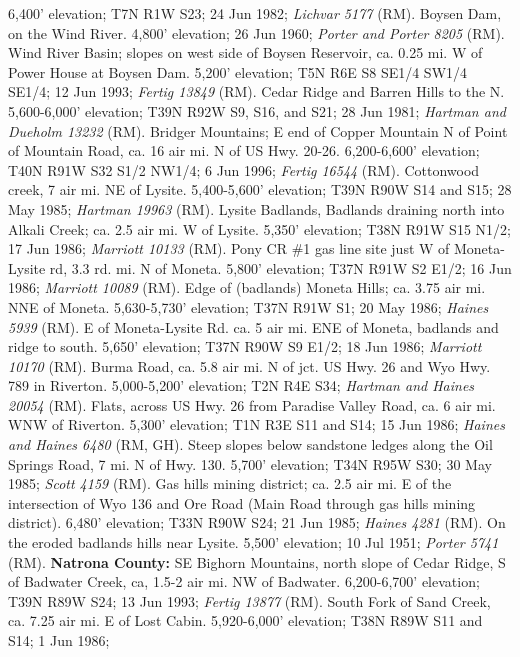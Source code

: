 6,400' elevation; T7N R1W S23; 24 Jun 1982; \textit{Lichvar 5177} (RM).
Boysen Dam, on the Wind River. 4,800' elevation; 26 Jun 1960;
\textit{Porter and Porter 8205} (RM).
Wind River Basin; slopes on west side of Boysen Reservoir, ca. 0.25 mi. W of
Power House at Boysen Dam. 5,200' elevation; T5N R6E S8	SE1/4 SW1/4 SE1/4;
12 Jun 1993; \textit{Fertig 13849} (RM).
Cedar Ridge and Barren Hills to the N. 5,600-6,000' elevation; T39N R92W S9,
S16, and S21; 28 Jun 1981; \textit{Hartman and Dueholm 13232} (RM).
Bridger Mountains; E end of Copper Mountain N of Point of Mountain Road, ca. 16
air mi. N of US Hwy. 20-26. 6,200-6,600' elevation; T40N R91W S32	S1/2 NW1/4;
6 Jun 1996; \textit{Fertig 16544} (RM).
Cottonwood creek, 7 air mi. NE of Lysite. 5,400-5,600' elevation; T39N R90W S14
and S15; 28 May 1985; \textit{Hartman 19963} (RM).
Lysite Badlands, Badlands draining north into Alkali Creek; ca. 2.5 air mi. W of
Lysite. 5,350' elevation; T38N R91W S15	N1/2; 17 Jun 1986;
\textit{Marriott 10133} (RM).
Pony CR \#1 gas line site just W of Moneta-Lysite rd, 3.3 rd. mi. N of Moneta.
5,800' elevation; T37N R91W S2	E1/2; 16 Jun 1986; \textit{Marriott 10089} (RM).
Edge of (badlands) Moneta Hills; ca. 3.75 air mi. NNE of Moneta.
5,630-5,730' elevation; T37N R91W S1; 20 May 1986; \textit{Haines 5939} (RM).
E of Moneta-Lysite Rd. ca. 5 air mi. ENE of Moneta, badlands and ridge to south.
5,650' elevation; T37N R90W S9	E1/2; 18 Jun 1986; \textit{Marriott 10170} (RM).
Burma Road, ca. 5.8 air mi. N of jct. US Hwy. 26 and Wyo Hwy. 789 in Riverton.
5,000-5,200' elevation; T2N R4E S34; \textit{Hartman and Haines 20054} (RM).
Flats, across US Hwy. 26 from Paradise Valley Road, ca. 6 air mi. WNW of
Riverton. 5,300' elevation; T1N R3E S11 and S14; 15 Jun 1986;
\textit{Haines and Haines 6480} (RM, GH).
Steep slopes below sandstone ledges along the Oil Springs Road, 7 mi. N of Hwy.
130. 5,700' elevation; T34N R95W S30; 30 May 1985; \textit{Scott 4159} (RM).
Gas hills mining district; ca. 2.5 air mi. E of the intersection of Wyo 136 and
Ore Road (Main Road through gas hills mining district). 6,480' elevation;
T33N R90W S24; 21 Jun 1985; \textit{Haines 4281} (RM).
On the eroded badlands hills near Lysite. 5,500' elevation; 10 Jul 1951;
\textit{Porter 5741} (RM).
  \textbf{Natrona County:}
SE Bighorn Mountains, north slope of Cedar Ridge, S of Badwater Creek, ca, 1.5-2
air mi. NW of Badwater. 6,200-6,700’ elevation; T39N R89W S24; 13 Jun 1993;
\textit{Fertig 13877} (RM).
South Fork of Sand Creek, ca. 7.25 air mi. E of Lost Cabin.
5,920-6,000’ elevation; T38N R89W S11 and S14; 1 Jun 1986;

